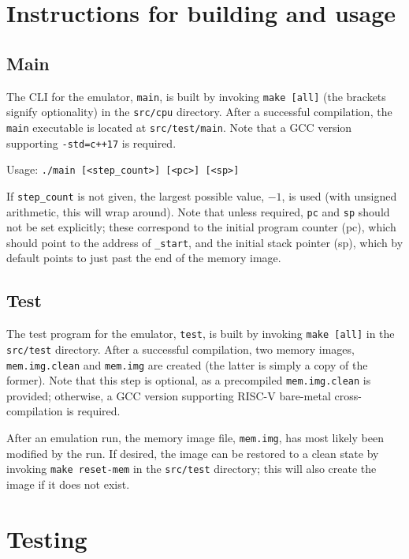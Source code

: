 \documentclass[a4paper]{amsart}
\begin{document}
\bigbreak
\section{Instructions for building and usage}

\medbreak
\subsection{Main}\label{subsec:main}
\noindent
The CLI for the emulator, \texttt{main}, is built by invoking \texttt{make [all]} (the brackets signify optionality) in the \texttt{src/cpu} directory.
After a successful compilation, the \texttt{main} executable is located at \texttt{src/test/main}.
Note that a GCC version supporting \texttt{-std=c++17} is required.

Usage: \texttt{./main [<step\_count>] [<pc>] [<sp>]}

If \texttt{step\_count} is not given, the largest possible value, $-1$, is used (with unsigned arithmetic, this will wrap around).
Note that unless required, \texttt{pc} and \texttt{sp} should not be set explicitly; these correspond to the initial program counter (pc), which should point to the address of \texttt{\_start}, and the initial stack pointer (sp), which by default points to just past the end of the memory image.


\medbreak
\subsection{Test}
\noindent
The test program for the emulator, \texttt{test}, is built by invoking \texttt{make [all]} in the \texttt{src/test} directory.
After a successful compilation, two memory images, \texttt{mem.img.clean} and \texttt{mem.img} are created (the latter is simply a copy of the former).
Note that this step is optional, as a precompiled \texttt{mem.img.clean} is provided; otherwise, a GCC version supporting RISC-V bare-metal cross-compilation is required.

After an emulation run, the memory image file, \texttt{mem.img}, has most likely been modified by the run.
If desired, the image can be restored to a clean state by invoking \texttt{make reset-mem} in the \texttt{src/test} directory; this will also create the image if it does not exist.



\bigbreak
\section{Testing}
\end{document}
